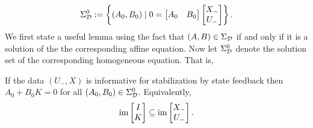 \begin{equation}\label{ch3:eq:sigma is 0}
	\Sigma_\calD^0 := \left\{(A_0,B_0) \mid 0 = \bbm A_0 & B_0 \ebm
	\begin{bmatrix}
		X_- \\ U_-
	\end{bmatrix}\right\}.
\end{equation}
We first state a useful lemma using the fact that $(A,B)\in\Sigma_{\mathcal{D}}$ if and only if it is a solution of the the corresponding affine equation. Now let $\Sigma_{\mathcal{D}}^0$ denote the solution set of the corresponding homogeneous equation. That is, 
\begin{lemma}
	\label{ch3:lemmaF0=0}
	If the data $(U_-,X)$ is informative for stabilization by state feedback then $A_0 + B_0 K = 0$ for all $(A_0,B_0) \in \Sigma_{\mathcal{D}}^0$. Equivalently, 
	$$
	\operatorname{im} \begin{bmatrix}
		I \\ K
	\end{bmatrix} \subseteq 
	\operatorname{im} \begin{bmatrix}
		X_- \\ U_-
	\end{bmatrix}.
	$$
\end{lemma}



